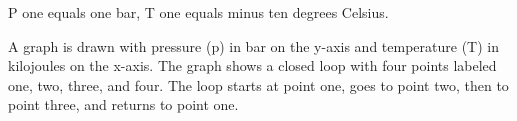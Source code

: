 P one equals one bar, T one equals minus ten degrees Celsius.

A graph is drawn with pressure (p) in bar on the y-axis and temperature (T) in kilojoules on the x-axis. The graph shows a closed loop with four points labeled one, two, three, and four. The loop starts at point one, goes to point two, then to point three, and returns to point one.